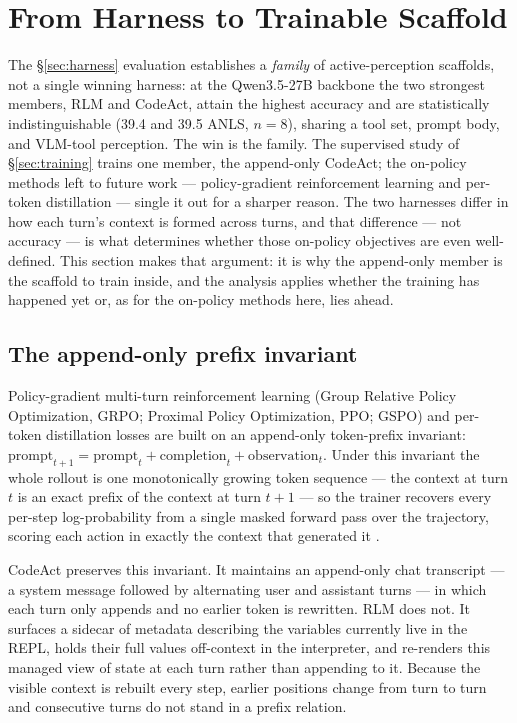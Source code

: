\section{From Harness to Trainable Scaffold}
\label{sec:scaffold}

The \S\ref{sec:harness} evaluation establishes a \emph{family} of active-perception scaffolds, not a single winning harness: at the Qwen3.5-27B backbone the two strongest members, RLM and CodeAct, attain the highest accuracy and are statistically indistinguishable (39.4 and 39.5 ANLS, $n{=}8$), sharing a tool set, prompt body, and VLM-tool perception. The win is the family. The supervised study of \S\ref{sec:training} trains one member, the append-only CodeAct; the on-policy methods left to future work --- policy-gradient reinforcement learning and per-token distillation --- single it out for a sharper reason. The two harnesses differ in how each turn's context is formed across turns, and that difference --- not accuracy --- is what determines whether those on-policy objectives are even well-defined. This section makes that argument: it is why the append-only member is the scaffold to train inside, and the analysis applies whether the training has happened yet or, as for the on-policy methods here, lies ahead.

\subsection{The append-only prefix invariant}

Policy-gradient multi-turn reinforcement learning (Group Relative Policy Optimization, GRPO; Proximal Policy Optimization, PPO; GSPO) and per-token distillation losses are built on an append-only token-prefix invariant: $\text{prompt}_{t+1} = \text{prompt}_t + \text{completion}_t + \text{observation}_t$. Under this invariant the whole rollout is one monotonically growing token sequence --- the context at turn $t$ is an exact prefix of the context at turn $t{+}1$ --- so the trainer recovers every per-step log-probability from a single masked forward pass over the trajectory, scoring each action in exactly the context that generated it \citep{renderers}.

CodeAct preserves this invariant. It maintains an append-only chat transcript --- a system message followed by alternating user and assistant turns --- in which each turn only appends and no earlier token is rewritten. RLM does not. It surfaces a sidecar of metadata describing the variables currently live in the REPL, holds their full values off-context in the interpreter, and re-renders this managed view of state at each turn rather than appending to it. Because the visible context is rebuilt every step, earlier positions change from turn to turn and consecutive turns do not stand in a prefix relation.

